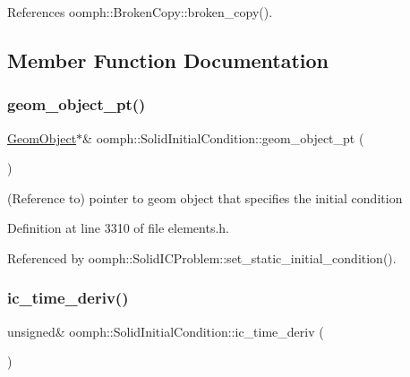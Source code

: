 References oomph\+::\+Broken\+Copy\+::broken\+\_\+copy().



\subsection{Member Function Documentation}
\mbox{\label{classoomph_1_1SolidInitialCondition_a441ecb1f0511a77b14d11e1225484a46}} 
\subsubsection{\texorpdfstring{geom\+\_\+object\+\_\+pt()}{geom\_object\_pt()}}
{\footnotesize\ttfamily \hyperlink{classoomph_1_1GeomObject}{Geom\+Object}$\ast$\& oomph\+::\+Solid\+Initial\+Condition\+::geom\+\_\+object\+\_\+pt (\begin{DoxyParamCaption}{ }\end{DoxyParamCaption})\hspace{0.3cm}{\ttfamily [inline]}}



(Reference to) pointer to geom object that specifies the initial condition 



Definition at line 3310 of file elements.\+h.



Referenced by oomph\+::\+Solid\+I\+C\+Problem\+::set\+\_\+static\+\_\+initial\+\_\+condition().

\mbox{\label{classoomph_1_1SolidInitialCondition_ad1fcd02e1af7c0d22f871e5f968ee5e0}} 
\subsubsection{\texorpdfstring{ic\+\_\+time\+\_\+deriv()}{ic\_time\_deriv()}}
{\footnotesize\ttfamily unsigned\& oomph\+::\+Solid\+Initial\+Condition\+::ic\+\_\+time\+\_\+deriv (\begin{DoxyParamCaption}{ }\end{DoxyParamCaption})\hspace{0.3cm}{\ttfamily [inline]}}



